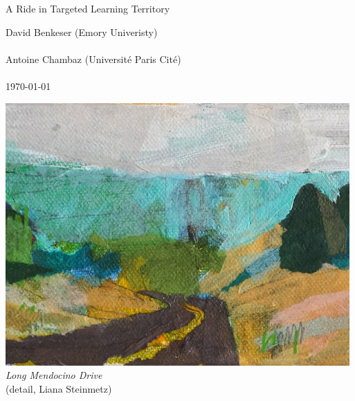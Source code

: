 \begin{titlepage}
  \centering
  \vspace*{3cm}
  \begin{Huge}
    {\color{WildStrawberry}{\hrule}}
    \vspace{1cm}
    A Ride in Targeted Learning Territory
    \vspace{1cm}
    {\color{WildStrawberry}{\hrule}}
  \end{Huge}
  \vspace*{1cm}  
  \begin{large}
    David Benkeser (Emory Univeristy)\\~\\
    Antoine Chambaz (Universit\'e Paris Cité)\\~\\
    \today\par
  \end{large}
  \vspace*{1cm}
  \includegraphics{cover.jpg}\\
  \textit{Long Mendocino Drive}\\
  (detail, Liana Steinmetz)
\end{titlepage}



